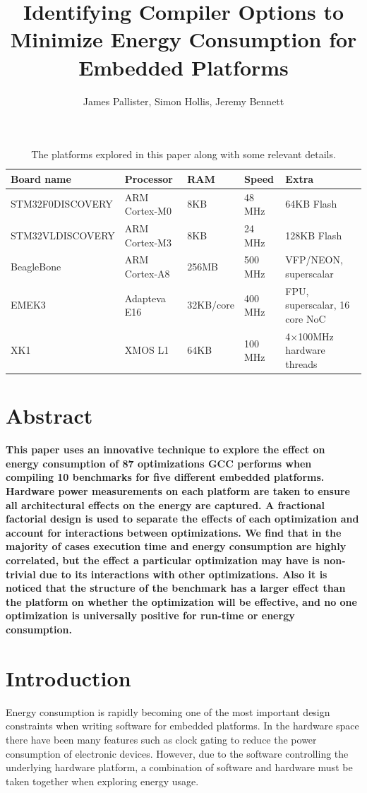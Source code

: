 \documentclass[twocolumn]{article}
\title{\bfseries\fontsize{22}{1}\selectfont Identifying Compiler Options to Minimize Energy Consumption for Embedded Platforms}
\author{James Pallister, Simon Hollis, Jeremy Bennett}
\newcommand{\nsection}[1]{\section{\bfseries #1}}
\let\oldcaption\caption
\renewcommand{\caption}[1]{\oldcaption{\textup{#1}}}
\begin{document}
\maketitle
\begin{table}[!hbt]
	\centering
	\begin{tabular}{l l l l l}
		\textbf{Board name} & \textbf{Processor} & \textbf{RAM} & \textbf{Speed} & \textbf{Extra} \\
		\hline
		STM32F0DISCOVERY	& ARM Cortex-M0 		& 8KB		& 48 MHz		  & 64KB Flash\\
		STM32VLDISCOVERY	& ARM Cortex-M3 		& 8KB		& 24 MHz		  & 128KB Flash\\
		BeagleBone			& ARM Cortex-A8 		& 256MB		& 500 MHz		  & VFP/NEON, superscalar\\
		EMEK3				& Adapteva E16 			& 32KB/core & 400 MHz		  & FPU, superscalar, 16 core NoC\\
		XK1					& XMOS L1 				& 64KB		& 100 MHz 		& 4$\times$100MHz hardware threads \\
	\end{tabular}
	\caption{The platforms explored in this paper along with some relevant details.}
	\label{Table:Platforms}
\end{table}

\nsection{Abstract}

{\bfseries
This paper uses an innovative technique to explore the effect on energy consumption of 87 optimizations GCC performs when compiling 10 benchmarks for five different embedded platforms. Hardware power measurements on each platform are taken to ensure all architectural effects on the energy are captured. A fractional factorial design is used to separate the effects of each optimization and account for interactions between optimizations. We find that in the majority of cases execution time and energy consumption are highly correlated, but the effect a particular optimization may have is non-trivial due to its interactions with other optimizations. Also it is noticed that the structure of the benchmark has a larger effect than the platform on whether the optimization will be effective, and no one optimization is universally positive for run-time or energy consumption.
}

\nsection{Introduction}


Energy consumption is rapidly becoming one of the most important design constraints when writing software for embedded platforms. In the hardware space there have been many features such as clock gating to reduce the power consumption of electronic devices. However, due to the software controlling the underlying hardware platform, a combination of software and hardware must be taken together when exploring energy usage.
\end{document}
